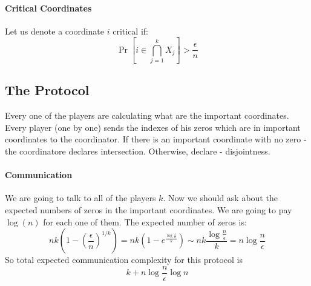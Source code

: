 \documentclass{article}
\theoremstyle{plain}
\begin{document}
\paragraph{Critical Coordinates}
Let us denote a coordinate $i$ critical if:
\begin{equation*}
    \Pr[i \in \bigcap^{k}_{j=1}{X_j}] > \frac{\epsilon}{n}
\end{equation*}
\subsection{The Protocol}
Every one of the players are calculating what are the important coordinates.
Every player (one by one) sends the indexes of his zeros which are in important coordinates to the coordinator.
If there is an important coordinate with no zero - the coordinatore declares intersection.
Otherwise, declare - disjointness.
\paragraph{Communication}
We are going to talk to all of the players $k$.
Now we should ask about the expected numbers of zeros in the important coordinates. We are going to pay $\log(n)$ for each one of them.
The expected number of zeros is:
\begin{equation*}
    nk\left(1-\left(\frac{\epsilon}{n}\right)^{1/k}\right) = nk\left(1-e^{\frac{\log{\frac{\epsilon}{n}}}{k}}\right) \sim nk\frac{\log{\frac{n}{\epsilon}}}{k} = n\log{\frac{n}{\epsilon}}
\end{equation*}
So total expected communication complexity for this protocol is
\begin{equation*}
    k + n\log{\frac{n}{\epsilon}}\log n
\end{equation*}
\end{document}
